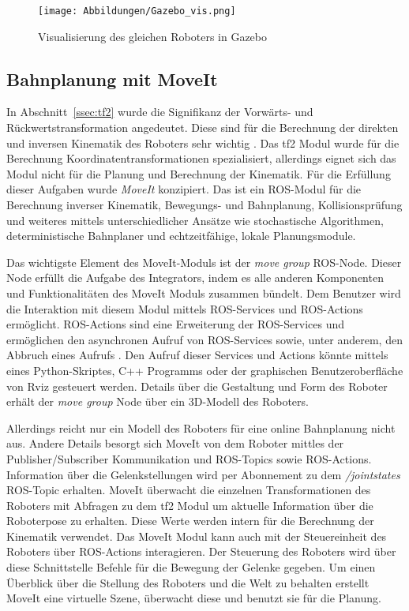 \begin{figure}[t]
		\texttt{[image: Abbildungen/Gazebo\_vis.png]}
		\centering
		\caption{Visualisierung des gleichen Roboters in Gazebo}
		\label{fig:Gazebo_vis}
\end{figure}

\subsection{Bahnplanung mit MoveIt}
In Abschnitt~\ref{ssec:tf2} wurde die Signifikanz der Vorwärts- und Rückwertstransformation angedeutet. Diese sind für die Berechnung der direkten und inversen Kinematik des Roboters sehr wichtig \autocite[41-118]{MareczekRobKin2020}. Das tf2 Modul wurde für die Berechnung Koordinatentransformationen spezialisiert, allerdings eignet sich das Modul nicht für die Planung und Berechnung der Kinematik. Für die Erfüllung dieser Aufgaben wurde \emph{MoveIt} konzipiert. Das ist ein ROS-Modul für die Berechnung inverser Kinematik, Bewegungs- und Bahnplanung, Kollisionsprüfung und weiteres mittels unterschiedlicher Ansätze wie stochastische Algorithmen, deterministische Bahnplaner und echtzeitfähige, lokale Planungsmodule. \autocite[160]{GandhinathanROSProjects2019}

Das wichtigste Element des MoveIt-Moduls ist der \emph{move \textunderscore group} ROS-Node. Dieser Node erfüllt die Aufgabe des Integrators, indem es alle anderen Komponenten und Funktionalitäten des MoveIt Moduls zusammen bündelt. Dem Benutzer wird die Interaktion mit diesem Modul mittels ROS-Services und ROS-Actions ermöglicht. ROS-Actions sind eine Erweiterung der ROS-Services und ermöglichen den asynchronen Aufruf von ROS-Services sowie, unter anderem, den Abbruch eines Aufrufs \autocite[61]{QuigleyROS2015}. Den Aufruf dieser Services und Actions könnte mittels eines Python-Skriptes, C++ Programms oder der graphischen Benutzeroberfläche von Rviz gesteuert werden. Details über die Gestaltung und Form des Roboter erhält der \textit{move \textunderscore group} Node über ein 3D-Modell des Roboters. \autocite[161]{GandhinathanROSProjects2019}

Allerdings reicht nur ein Modell des Roboters für eine online Bahnplanung nicht aus. Andere Details besorgt sich MoveIt von dem Roboter mittles der Publisher/Subscriber Kommunikation und ROS-Topics sowie ROS-Actions. Information über die Gelenkstellungen wird per Abonnement zu dem \textit{/joint\textunderscore states} ROS-Topic erhalten. MoveIt überwacht die einzelnen Transformationen des Roboters mit Abfragen zu dem tf2 Modul um aktuelle Information über die Roboterpose zu erhalten. Diese Werte werden intern für die Berechnung der Kinematik verwendet. Das MoveIt Modul kann auch mit der Steuereinheit des Roboters über ROS-Actions interagieren. Der Steuerung des Roboters wird über diese Schnittstelle Befehle für die Bewegung der Gelenke gegeben. Um einen Überblick über die Stellung des Roboters und die Welt zu behalten erstellt MoveIt eine virtuelle Szene, überwacht diese und benutzt sie für die Planung. \autocite{moveit_concepts_2021}

